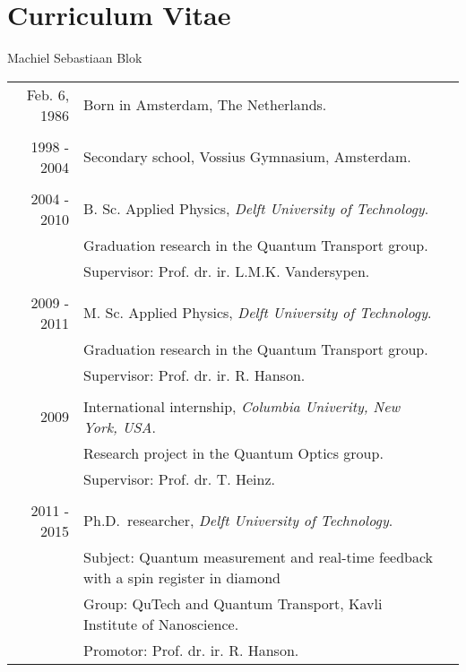 \chapter{Curriculum Vitae}
\markboth{}{}

\begin{center}
{\large Machiel Sebastiaan Blok}
\end{center}

\vspace{1cm}


\begin{tabular*}{\textwidth}{rp{10cm}c@{\extracolsep{\fill}}}
Feb. 6, 1986 & Born in Amsterdam, The Netherlands.&\\
&& \\
1998 - 2004 & Secondary school, Vossius Gymnasium, Amsterdam.&  \\
&& \\
2004 - 2010 & B. Sc. Applied Physics, \textit{Delft University of Technology}.&\\
& Graduation research in the Quantum Transport group.  &\\
& Supervisor: Prof. dr. ir. L.M.K. Vandersypen. & \\
&&\\
2009 - 2011 & M. Sc. Applied Physics, \textit{Delft University of Technology}. \\
&Graduation research in the Quantum Transport group.  &\\
& Supervisor: Prof. dr. ir. R. Hanson. &\\
&& \\
2009 & International internship, \textit{Columbia Univerity, New York, USA}.&\\
& Research project in the Quantum Optics group. &\\
& Supervisor: Prof. dr. T. Heinz. &\\
&&\\
2011 - 2015 & Ph.D.\ researcher, \textit{Delft University of Technology}.&\\
& Subject: Quantum measurement and real-time feedback with a spin register in diamond&\\
& Group: QuTech and Quantum Transport, Kavli Institute of Nanoscience. &\\
& Promotor: Prof. dr. ir. R. Hanson.&\\
\end{tabular*}

